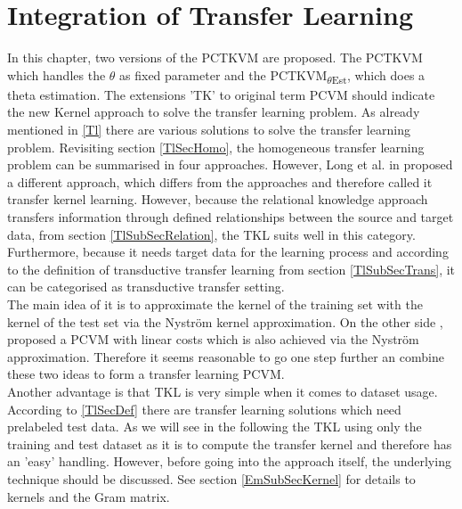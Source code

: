 \chapter{Integration of Transfer Learning}\label{In}
In this chapter, two versions of the \ac{PCTKVM} are proposed.
The \acs{PCTKVM} which handles the $\theta$ as fixed parameter and the \acs{PCTKVM}\textsubscript{$\theta$Est}, which does a theta estimation.
The extensions 'TK' to original term \acs{PCVM} should indicate the new Kernel approach to solve the transfer learning problem.
As already mentioned in \ref{Tl} there are various solutions to solve the transfer learning problem.
Revisiting section \ref{TlSecHomo}, the homogeneous transfer learning problem can be summarised in four approaches.\newline
However, Long et al. in \cite{Long.2015} proposed a different approach, which differs from the approaches and therefore called it transfer kernel learning.
However, because the relational knowledge approach transfers information through defined relationships between the source and target data, from section \ref{TlSubSecRelation}, the \acs{TKL} suits well in this category.
Furthermore, because it needs target data for the learning process and according to the definition of transductive transfer learning from section \ref{TlSubSecTrans}, it can be categorised as transductive transfer setting.\\
The main idea of it is to approximate the kernel of the training set with the kernel of the test set via the Nyström kernel approximation.\cite{Long.2015}
On the other side \cite{Schleif.2015}, proposed a \acs{PCVM} with linear costs which is also achieved via the Nyström approximation.
Therefore it seems reasonable to go one step further an combine these two ideas to form a transfer learning \acs{PCVM}.\\
Another advantage is that \acs{TKL} is very simple when it comes to dataset usage.
According to \ref{TlSecDef} there are transfer learning solutions which need prelabeled test data.
As we will see in the following the \acs{TKL} using only the training and test dataset as it is to compute the transfer kernel and therefore has an 'easy' handling.\newline
However, before going into the approach itself, the underlying technique should be discussed.
See section \ref{EmSubSecKernel} for details to kernels and the Gram matrix.

